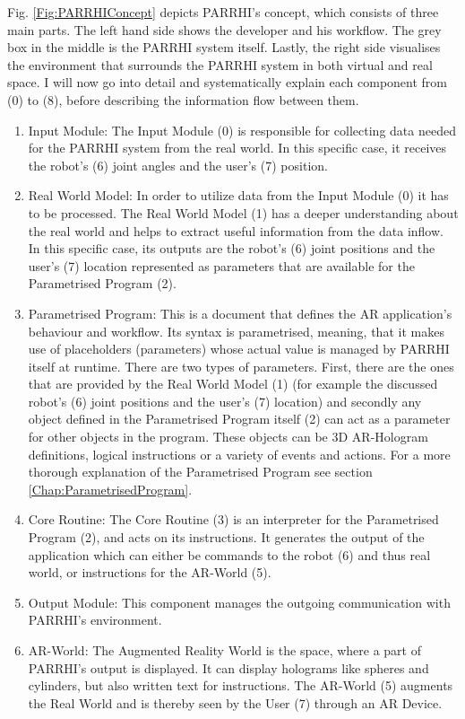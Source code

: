 Fig. \ref{Fig:PARRHIConcept} depicts PARRHI's concept, which consists of three main parts. The left hand side shows the developer and his workflow. The grey box in the middle is the PARRHI system itself. Lastly, the right side visualises the environment that surrounds the PARRHI system in both virtual and real space. I will now go into detail and systematically explain each component from (0) to (8), before describing the information flow between them.

\begin{enumerate}
	\addtocounter{enumi}{-1}
	\setlength\itemsep{-1em}
	\item Input Module: The Input Module (0) is responsible for collecting data needed for the PARRHI system from the real world. In this specific case, it  receives the robot's (6) joint angles and the user's (7) position.
	\item Real World Model: In order to utilize data from the Input Module (0) it has to be processed. The Real World Model (1) has a deeper understanding about the real world and helps to extract useful information from the data inflow. In this specific case, its outputs are the robot's (6) joint positions and the user's (7) location represented as parameters that are available for the Parametrised Program (2).
	\item Parametrised Program: This is a document that defines the AR application's behaviour and workflow. Its syntax is parametrised, meaning, that it makes use of placeholders (parameters) whose actual value is managed by PARRHI itself at runtime. There are two types of parameters. First, there are the ones that are provided by the Real World Model (1) (for example the discussed robot's (6) joint positions and the user's (7) location) and secondly any object defined in the Parametrised Program itself (2) can act as a parameter for other objects in the program. These objects can be 3D AR-Hologram definitions, logical instructions or a variety of events and actions. For a more thorough explanation of the Parametrised Program see section \ref{Chap:ParametrisedProgram}.
	\item Core Routine: The Core Routine (3) is an interpreter for the Parametrised Program (2), and acts on its instructions. It generates the output of the application which can either be commands to the robot (6) and thus real world, or instructions for the AR-World (5).
	\item Output Module: This component manages the outgoing communication with PARRHI's environment. 
	\item AR-World: The Augmented Reality World is the space, where a part of PARRHI's output is displayed. It can display holograms like spheres and cylinders, but also written text for instructions. The AR-World (5) augments the Real World and is thereby seen by the User (7) through an AR Device.

\end{enumerate}
